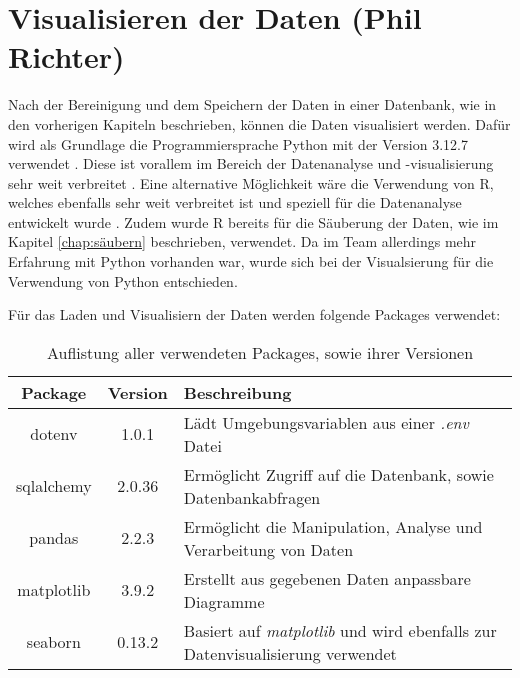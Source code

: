 \chapter{Visualisieren der Daten (Phil Richter)}
Nach der Bereinigung und dem Speichern der Daten in einer Datenbank, wie in den vorherigen Kapiteln beschrieben, können die Daten visualisiert werden. Dafür wird als Grundlage
die Programmiersprache Python mit der Version 3.12.7 verwendet \cite{noauthor_python_nodate}. Diese ist vorallem im Bereich der Datenanalyse und -visualisierung sehr weit
verbreitet \cite{noauthor_most_nodate, noauthor_popular_nodate}. Eine alternative Möglichkeit wäre die Verwendung von R, welches ebenfalls sehr weit verbreitet ist und speziell
für die Datenanalyse entwickelt wurde \cite{noauthor_r_nodate}. Zudem wurde R bereits für die Säuberung der Daten, wie im Kapitel \ref{chap:säubern} beschrieben, verwendet.
Da im Team allerdings mehr Erfahrung mit Python vorhanden war, wurde sich bei der Visualsierung für die Verwendung von Python entschieden.

Für das Laden und Visualisiern der Daten werden folgende Packages verwendet:
\begin{table}[h!]
    \centering
    \begin{tabularx}{\textwidth}{|c|c|>{\centering\arraybackslash}X|}
        \hline
        \textbf{Package} & \textbf{Version} & \textbf{Beschreibung} \\ \hline
        dotenv & 1.0.1 & Lädt Umgebungsvariablen aus einer \textit{.env} Datei \\ \hline
        sqlalchemy & 2.0.36 & Ermöglicht Zugriff auf die Datenbank, sowie Datenbankabfragen \\ \hline
        pandas & 2.2.3 & Ermöglicht die Manipulation, Analyse und Verarbeitung von Daten \\ \hline
        matplotlib & 3.9.2 & Erstellt aus gegebenen Daten anpassbare Diagramme \\ \hline
        seaborn & 0.13.2 & Basiert auf \textit{matplotlib} und wird ebenfalls zur Datenvisualisierung verwendet \\ \hline
    \end{tabularx}
    \caption{Auflistung aller verwendeten Packages, sowie ihrer Versionen}
\end{table}

